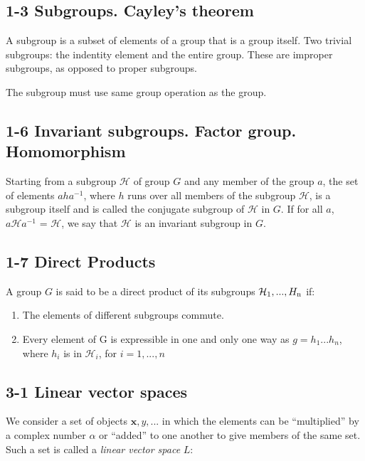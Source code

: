 \documentclass{article}
\begin{document}
\subsection{1-3 Subgroups. Cayley's theorem}

A subgroup is a subset of elements of a group that is a group itself. Two trivial subgroups: the indentity element and the entire group. These are improper subgroups, as opposed to proper subgroups.

The subgroup must use same group operation as the group.

\subsection{1-6 Invariant subgroups. Factor group. Homomorphism}

Starting from a subgroup $\mathcal H$ of group $G$ and any member of the group $a$, the set of elements $aha^{-1}$, where $h$ runs over all members of the subgroup $\mathcal H$, is a subgroup itself and is called the conjugate subgroup of $\mathcal H$ in $G$. If for all $a$, $a{\mathcal H} a^{-1}$ =  $\mathcal H$, we say that $\mathcal H$ is an invariant subgroup in $G$.

\subsection{1-7 Direct Products}

A group $G$ is said to be a direct product of its subgroups ${\mathcal H_{\rm 1},...,H_{\rm n}}$ if:

\begin{enumerate}
\item The elements of different subgroups commute.
\item Every element of G is expressible in one and only one way as $g = h_1...h_n$, where $h_i$ is in ${\mathcal H}_i$, for $i = 1,...,n$
\end{enumerate}

\subsection{3-1 Linear vector spaces}

\def\bx{\mathbf x}
\def\by{\mathbf y}

We consider a set of objects $\mathbf x,y,...$ in which the elements can be ``multiplied'' by a complex number $\alpha$ or ``added'' to one another to give members of the same set. Such a set is called a {\it linear vector space} $L$:
\end{document}
